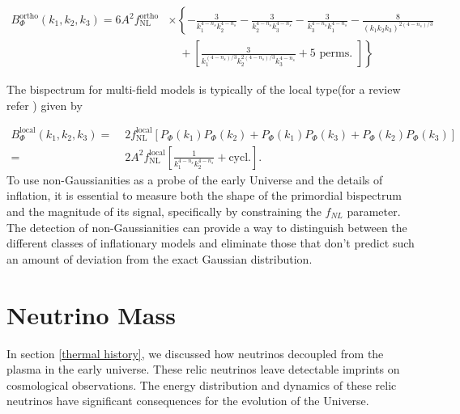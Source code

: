 \begin{equation}
\begin{aligned}
    B_{\Phi}^{\text{ortho}}\left(k_1, k_2, k_3\right) = 6 A^2 f_{\mathrm{NL}}^{\text{ortho}} & \times\left\{-\frac{3}{k_1^{4-n_s} k_2^{4-n_s}} - \frac{3}{k_2^{4-n_s} k_3^{4-n_s}} - \frac{3}{k_3^{4-n_s} k_1^{4-n_s}} - \frac{8}{\left(k_1 k_2 k_3\right)^{2\left(4-n_s\right) / 3}}\right. \\
    & \left.\quad + \left[\frac{3}{k_1^{\left(4-n_s\right) / 3} k_2^{2\left(4-n_s\right) / 3} k_3^{4-n_s}} + 5 \text{ perms. }\right]\right\}
\end{aligned}
\label{eq:1.232}
\end{equation}

The bispectrum for multi-field models is typically of the local type(for a review refer \cite{Byrnes_2010}) given by 

\begin{equation}
    \begin{aligned}
        B_{\Phi}^{\text{local}}\left(k_1, k_2, k_3\right) = & \; 2 f_{\mathrm{NL}}^{\text{local}}\left[P_{\Phi}\left(k_1\right) P_{\Phi}\left(k_2\right) + P_{\Phi}\left(k_1\right) P_{\Phi}\left(k_3\right) + P_{\Phi}\left(k_2\right) P_{\Phi}\left(k_3\right)\right] \\
        = & \; 2 A^2 f_{\mathrm{NL}}^{\text{local}}\left[\frac{1}{k_1^{4-n_s} k_2^{4-n_s}} + \text{cycl.}\right].\label{eq:1.233}
    \end{aligned}
\end{equation}
To use non-Gaussianities as a probe of the early Universe and the details of inflation, it is essential to measure both the shape of the primordial bispectrum and the magnitude of its signal, specifically by constraining the $f_{NL}$  parameter. The detection of non-Gaussianities can provide a way to distinguish between the different classes of inflationary models and eliminate those that don’t predict
such an amount of deviation from the exact Gaussian distribution.


\section{Neutrino Mass} \label{neutrinos}
In section \ref{thermal history}, we discussed how neutrinos decoupled from the plasma in the early universe. These relic neutrinos leave detectable imprints on cosmological observations. The energy distribution and dynamics of these relic neutrinos have significant consequences for the evolution of the Universe.


